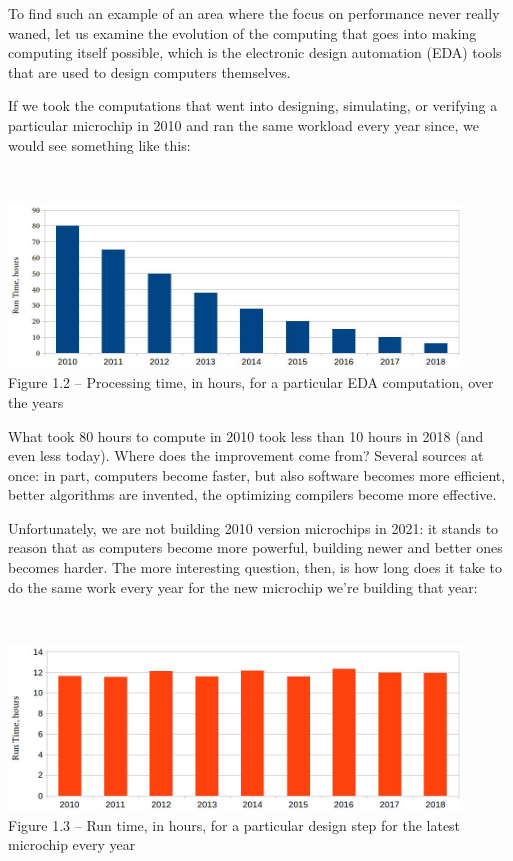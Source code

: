 To find such an example of an area where the focus on performance never really waned, let us examine the evolution of the computing that goes into making computing itself possible, which is the electronic design automation (EDA) tools that are used to design computers themselves.

If we took the computations that went into designing, simulating, or verifying a particular microchip in 2010 and ran the same workload every year since, we would see something like this:

\hspace*{\fill} \\ %
\begin{center}
\includegraphics[width=0.9\textwidth]{content/1/chapter1/images/2.jpg}\\
Figure 1.2 – Processing time, in hours, for a particular EDA computation, over the years
\end{center}

What took 80 hours to compute in 2010 took less than 10 hours in 2018 (and even less today). Where does the improvement come from? Several sources at once: in part, computers become faster, but also software becomes more efficient, better algorithms are invented, the optimizing compilers become more effective.

Unfortunately, we are not building 2010 version microchips in 2021: it stands to reason that as computers become more powerful, building newer and better ones becomes harder. The more interesting question, then, is how long does it take to do the same work every year for the new microchip we're building that year:

\hspace*{\fill} \\ %
\begin{center}
\includegraphics[width=0.9\textwidth]{content/1/chapter1/images/3.jpg}\\
Figure 1.3 – Run time, in hours, for a particular design step for the latest microchip every year
\end{center}

